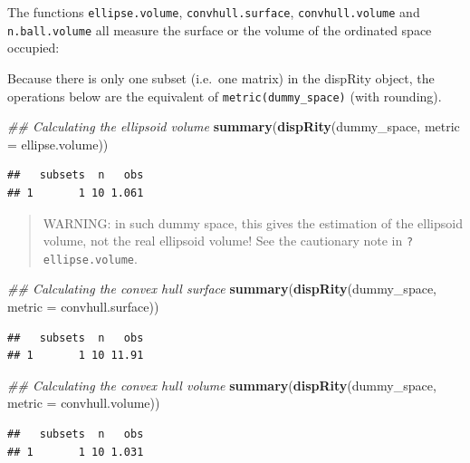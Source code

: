 \documentclass[]{book}
\newenvironment{Shaded}{\begin{snugshade}}{\end{snugshade}}
\newcommand{\CommentTok}[1]{\textcolor[rgb]{0.56,0.35,0.01}{\textit{#1}}}
\newcommand{\DataTypeTok}[1]{\textcolor[rgb]{0.13,0.29,0.53}{#1}}
\newcommand{\KeywordTok}[1]{\textcolor[rgb]{0.13,0.29,0.53}{\textbf{#1}}}
\newcommand{\NormalTok}[1]{#1}
\begin{document}
The functions \texttt{ellipse.volume}, \texttt{convhull.surface}, \texttt{convhull.volume} and \texttt{n.ball.volume} all measure the surface or the volume of the ordinated space occupied:

Because there is only one subset (i.e.~one matrix) in the dispRity object, the operations below are the equivalent of \texttt{metric(dummy\_space)} (with rounding).

\begin{Shaded}
\begin{Highlighting}[]
\CommentTok{## Calculating the ellipsoid volume}
\KeywordTok{summary}\NormalTok{(}\KeywordTok{dispRity}\NormalTok{(dummy_space, }\DataTypeTok{metric =}\NormalTok{ ellipse.volume))}
\end{Highlighting}
\end{Shaded}

\begin{verbatim}
##   subsets  n   obs
## 1       1 10 1.061
\end{verbatim}

\begin{quote}
WARNING: in such dummy space, this gives the estimation of the ellipsoid volume, not the real ellipsoid volume! See the cautionary note in \texttt{?ellipse.volume}.
\end{quote}

\begin{Shaded}
\begin{Highlighting}[]
\CommentTok{## Calculating the convex hull surface}
\KeywordTok{summary}\NormalTok{(}\KeywordTok{dispRity}\NormalTok{(dummy_space, }\DataTypeTok{metric =}\NormalTok{ convhull.surface))}
\end{Highlighting}
\end{Shaded}

\begin{verbatim}
##   subsets  n   obs
## 1       1 10 11.91
\end{verbatim}

\begin{Shaded}
\begin{Highlighting}[]
\CommentTok{## Calculating the convex hull volume}
\KeywordTok{summary}\NormalTok{(}\KeywordTok{dispRity}\NormalTok{(dummy_space, }\DataTypeTok{metric =}\NormalTok{ convhull.volume))}
\end{Highlighting}
\end{Shaded}

\begin{verbatim}
##   subsets  n   obs
## 1       1 10 1.031
\end{verbatim}
\end{document}
